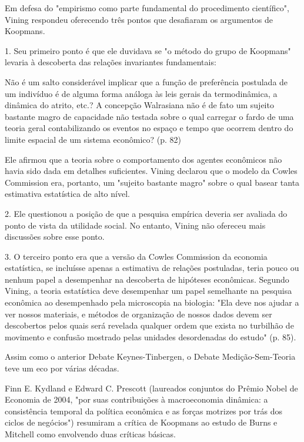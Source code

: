 \documentclass[12pt]{article}
\begin{document}
Em defesa do "empirismo como parte fundamental do procedimento científico", Vining respondeu oferecendo três pontos que desafiaram os argumentos de Koopmans.

1. Seu primeiro ponto é que ele duvidava se "o método do grupo de Koopmans" levaria à descoberta das relações invariantes fundamentais:

Não é um salto considerável implicar que a função de preferência postulada de um indivíduo é de alguma forma análoga às leis gerais da termodinâmica, a dinâmica do atrito, etc.? A concepção Walrasiana não é de fato um sujeito bastante magro de capacidade não testada sobre o qual carregar o fardo de uma teoria geral contabilizando os eventos no espaço e tempo que ocorrem dentro do limite espacial de um sistema econômico? (p. 82)

Ele afirmou que a teoria sobre o comportamento dos agentes econômicos não havia sido dada em detalhes suficientes. Vining declarou que o modelo da Cowles Commission era, portanto, um "sujeito bastante magro" sobre o qual basear tanta estimativa estatística de alto nível.

2. Ele questionou a posição de que a pesquisa empírica deveria ser avaliada do ponto de vista da utilidade social. No entanto, Vining não ofereceu mais discussões sobre esse ponto.

3. O terceiro ponto era que a versão da Cowles Commission da economia estatística, se incluísse apenas a estimativa de relações postuladas, teria pouco ou nenhum papel a desempenhar na descoberta de hipóteses econômicas. Segundo Vining, a teoria estatística deve desempenhar um papel semelhante na pesquisa econômica ao desempenhado pela microscopia na biologia: "Ela deve nos ajudar a ver nossos materiais, e métodos de organização de nossos dados devem ser descobertos pelos quais será revelada qualquer ordem que exista no turbilhão de movimento e confusão mostrado pelas unidades desordenadas do estudo" (p. 85).

Assim como o anterior Debate Keynes-Tinbergen, o Debate Medição-Sem-Teoria teve um eco por várias décadas.

Finn E. Kydland e Edward C. Prescott (laureados conjuntos do Prêmio Nobel de Economia de 2004, "por suas contribuições à macroeconomia dinâmica: a consistência temporal da política econômica e as forças motrizes por trás dos ciclos de negócios") resumiram a crítica de Koopmans ao estudo de Burns e Mitchell como envolvendo duas críticas básicas.
\end{document}
